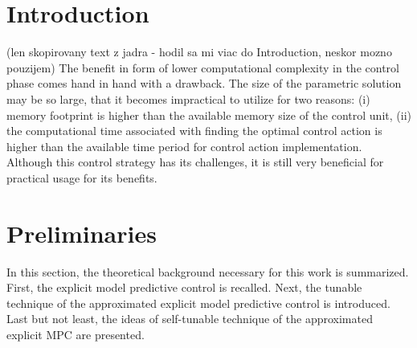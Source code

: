 \documentclass[preprint,12pt]{elsarticle}
\begin{document}

\section{Introduction}
\label{sec:introduction}
 
(len skopirovany text z jadra - hodil sa mi viac do Introduction, neskor mozno pouzijem) The benefit in form of lower computational complexity in the control phase comes hand in hand with a drawback. The size of the parametric solution may be so large, that it becomes impractical to utilize for two reasons: (i) memory footprint is higher than the available memory size of the control unit, (ii) the computational time associated with finding the optimal control action is higher than the available time period for control action implementation. Although this control strategy has its challenges, it is still very beneficial for practical usage for its benefits. 

\section{Preliminaries}
\label{sec:preliminaries}
In this section, the theoretical background necessary for this work is summarized. First, the explicit model predictive control is recalled. Next, the tunable technique of the approximated explicit model predictive control is introduced. Last but not least, the ideas of self-tunable technique of the approximated explicit MPC are presented.
\end{document}
